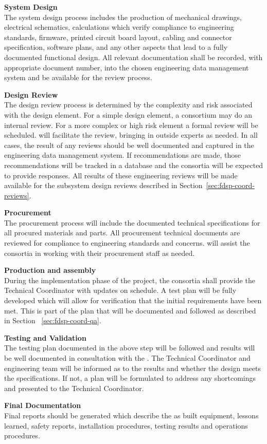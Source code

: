 {\bf System Design}\\
The system design process includes the production of mechanical
drawings, electrical schematics, calculations which verify compliance
to engineering standards, firmware, printed circuit board layout,
cabling and connector specification, software plans, and any other
aspects that lead to a fully documented functional design.  All
relevant documentation shall be recorded, with appropriate document
number, into the chosen engineering data management system and be
available for the review process.

{\bf Design Review}\\ The design review process is determined by the
complexity and risk associated with the design element.  For a simple
design element, a consortium may do an internal review.  For a more
complex or high risk element a formal review will be scheduled.
  will facilitate the review,
bringing in outside experts as needed.  In all cases, the result of
any reviews should be well documented and captured in the engineering
data management system.  If recommendations are made, those
recommendations will be tracked in a database and the consortia will
be expected to provide responses. All results of these engineering
reviews will be made available for the subsystem design reviews
described in Section~\ref{sec:fdsp-coord-reviews}.

{\bf Procurement}\\ The procurement process will include the
documented technical specifications for all procured materials and
parts.  All procurement technical documents are reviewed for
compliance to engineering standards and  concerns.
  will assist the consortia in working with
their procurement staff as needed.

{\bf Production and assembly}\\ During the implementation phase of the project,
the consortia shall provide the Technical Coordinator with updates on
schedule.  A test plan will be fully developed which will allow for
verification that the initial requirements have been met. This is part of
the  plan that will be documented and followed as described
in Section ~\ref{sec:fdsp-coord-qa}.

{\bf Testing and Validation\\} The testing plan documented in the
above step will be followed and results will be well documented in
consultation with the .  The Technical Coordinator and 
engineering team will be informed as to the results and whether the
design meets the specifications.  If not, a plan will be formulated to
address any shortcomings and presented to the Technical Coordinator.

{\bf Final Documentation\\} Final reports should be generated which
describe the as built equipment, lessons learned, safety reports,
installation procedures, testing results and operations procedures.
